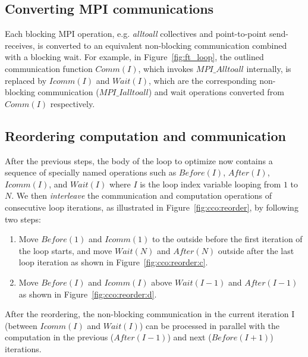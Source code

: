 \subsection{Converting MPI communications}
Each blocking MPI operation, e.g. {\em alltoall} collectives and point-to-point send-receives,
is converted to an equivalent non-blocking communication combined with a blocking wait.
For example,  in Figure~\ref{fig:ft_loop}, the outlined communication function $Comm(I)$,  which invokes $MPI\_Alltoall$ internally, is replaced by $Icomm(I)$ and $Wait(I)$, which are the corresponding non-blocking communication ($MPI\_Ialltoall$) and wait operations converted from $Comm(I)$ respectively.

\subsection{Reordering computation and communication}

After the previous steps, the body of the loop to optimize now contains a sequence of specially
named operations such as
 $Before(I)$, $After(I)$, $Icomm(I)$, and $Wait(I)$
  where $I$ is the loop index variable looping from $1$ to $N$.
%
%
%
%
%
We then %
  \emph{interleave} the communication and computation operations of consecutive loop iterations,
  as illustrated in Figure~\ref{fig:cco:reorder},  by following two steps:
\begin{enumerate}
\item Move $Before(1)$ and $Icomm(1)$ to the outside before the first iteration of the loop starts,
  and move $Wait(N)$ and $After(N)$ outside after the last loop iteration
  as shown in Figure~\ref{fig:cco:reorder:c}.
\item Move $Before(I)$ and $Icomm(I)$ above $Wait(I-1)$ and $After(I-1)$
  as shown in Figure~\ref{fig:cco:reorder:d}.
\end{enumerate}
After the reordering, the non-blocking communication in the current iteration I (between $Icomm(I)$ and $Wait(I)$)
   can be processed in parallel with the computation in the previous ($After(I-1)$) and next ($Before(I+1)$) iterations.

